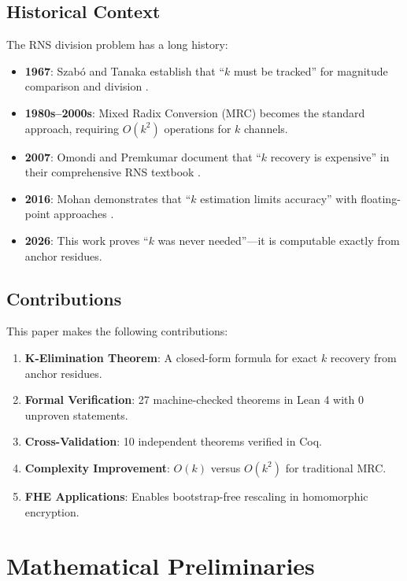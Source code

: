 \documentclass[11pt,a4paper]{article}
\begin{document}
\subsection{Historical Context}

The RNS division problem has a long history:

\begin{itemize}[noitemsep]
    \item \textbf{1967}: Szab\'{o} and Tanaka establish that ``$k$ must be tracked'' for magnitude comparison and division \cite{szabo1967}.
    \item \textbf{1980s--2000s}: Mixed Radix Conversion (MRC) becomes the standard approach, requiring $O(k^2)$ operations for $k$ channels.
    \item \textbf{2007}: Omondi and Premkumar document that ``$k$ recovery is expensive'' in their comprehensive RNS textbook \cite{omondi2007}.
    \item \textbf{2016}: Mohan demonstrates that ``$k$ estimation limits accuracy'' with floating-point approaches \cite{mohan2016}.
    \item \textbf{2026}: This work proves ``$k$ was never needed''---it is computable exactly from anchor residues.
\end{itemize}

\subsection{Contributions}

This paper makes the following contributions:

\begin{enumerate}[noitemsep]
    \item \textbf{K-Elimination Theorem}: A closed-form formula for exact $k$ recovery from anchor residues.
    \item \textbf{Formal Verification}: 27 machine-checked theorems in Lean 4 with 0 unproven statements.
    \item \textbf{Cross-Validation}: 10 independent theorems verified in Coq.
    \item \textbf{Complexity Improvement}: $O(k)$ versus $O(k^2)$ for traditional MRC.
    \item \textbf{FHE Applications}: Enables bootstrap-free rescaling in homomorphic encryption.
\end{enumerate}

\section{Mathematical Preliminaries}
\end{document}
